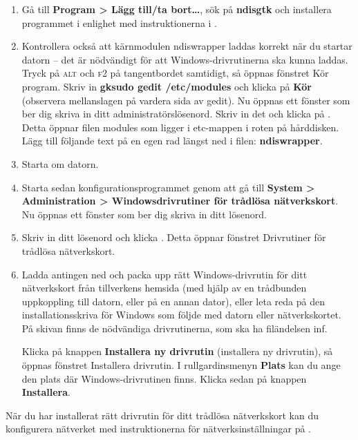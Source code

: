 \documentclass[a4paper,final]{memoir} %
\begin{document}
\begin{enumerate}

\item  Gå till \textbf{Program \textgreater{} Lägg till/ta bort\ldots{}}, sök på \textbf{ndisgtk} och installera programmet i enlighet med instruktionerna i .

\item Kontrollera också att kärnmodulen ndiswrapper laddas korrekt när du startar datorn -- det är nödvändigt för att Windows-drivrutinerna ska kunna laddas. Tryck på \textsc{alt} och \textsc{f2} på tangentbordet samtidigt, så öppnas fönstret Kör program. Skriv in \textbf{gksudo gedit /etc/modules} och klicka på \textbf{Kör} (observera mellanslagen på vardera sida av gedit). Nu öppnas ett fönster som ber dig skriva in ditt administratörslösenord. Skriv in det och klicka på \xok{}. Detta öppnar filen modules som ligger i etc-mappen i roten på hårddisken. Lägg till följande text på en egen rad längst ned i filen: \textbf{ndiswrapper}.

\item Starta om datorn.

\item Starta sedan konfigurationsprogrammet genom att gå till \textbf{System \textgreater{} Administration \textgreater{} Windowsdrivrutiner för trådlösa nätverkskort}. Nu öppnas ett fönster som ber dig skriva in ditt lösenord.

\item Skriv in ditt lösenord och klicka \xok{}. Detta öppnar fönstret Drivrutiner för trådlösa nätverkskort. 

\item Ladda antingen ned och packa upp rätt Windows-drivrutin för ditt nätverkskort från tillverkens hemsida (med hjälp av en trådbunden uppkoppling till datorn, eller på en annan dator), eller leta reda på den installationsskriva för Windows som följde med datorn eller nätverkskortet. På skivan finns de nödvändiga drivrutinerna, som ska ha filändelsen inf.

Klicka på knappen \textbf{Installera ny drivrutin} (installera ny drivrutin), så öppnas fönstret Installera drivrutin. I rullgardinsmenyn \textbf{Plats} kan du ange den plats där Windows-drivrutinen finns. Klicka sedan på knappen \textbf{Installera}.

\end{enumerate}

När du har installerat rätt drivrutin för ditt trådlösa nätverkskort kan du konfigurera nätverket med instruktionerna för nätverksinställningar på .
\end{document}

